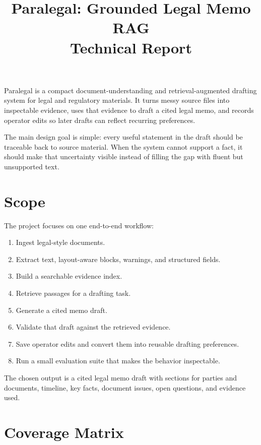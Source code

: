 \documentclass[11pt]{article}
\title{\textbf{Paralegal: Grounded Legal Memo RAG}\\Technical Report}
\author{}
\date{}
\begin{document}
\maketitle

\noindent Paralegal is a compact document-understanding and retrieval-augmented drafting system for legal and regulatory materials. It turns messy source files into inspectable evidence, uses that evidence to draft a cited legal memo, and records operator edits so later drafts can reflect recurring preferences.

\medskip
\noindent The main design goal is simple: every useful statement in the draft should be traceable back to source material. When the system cannot support a fact, it should make that uncertainty visible instead of filling the gap with fluent but unsupported text.

\section{Scope}

The project focuses on one end-to-end workflow:

\begin{enumerate}
  \item Ingest legal-style documents.
  \item Extract text, layout-aware blocks, warnings, and structured fields.
  \item Build a searchable evidence index.
  \item Retrieve passages for a drafting task.
  \item Generate a cited memo draft.
  \item Validate that draft against the retrieved evidence.
  \item Save operator edits and convert them into reusable drafting preferences.
  \item Run a small evaluation suite that makes the behavior inspectable.
\end{enumerate}

The chosen output is a cited legal memo draft with sections for parties and documents, timeline, key facts, document issues, open questions, and evidence used.

\section{Coverage Matrix}
\end{document}
